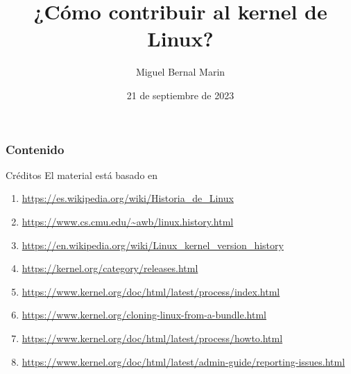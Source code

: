 \documentclass[aspectratio=169]{beamer}
\title{¿Cómo contribuir al kernel de Linux?}
\author[\textcircled{cc} BY-SA]{Miguel Bernal Marin} %
\institute[]
{
Nombre del evento \\
}
\date{
    21 de septiembre de 2023
}
\newcommand{\nologo}{\setbeamertemplate{logo}{}} %
\begin{document}
\begin{frame}
    \titlepage
\end{frame}

{\nologo}


\begin{frame}
    \frametitle{Contenido}
    \tableofcontents
\end{frame}



\begin{frame}[c]{Créditos}
  \label{creditos}
  El material está basado en
  \begin{enumerate}
    \item
      \href{https://es.wikipedia.org/wiki/Historia_de_Linux}
      {https://es.wikipedia.org/wiki/Historia\_de\_Linux}
    \item
      \href{https://www.cs.cmu.edu/~awb/linux.history.html}
      {https://www.cs.cmu.edu/\~{}awb/linux.history.html}
    \item
      \href{https://en.wikipedia.org/wiki/Linux_kernel_version_history}
      {https://en.wikipedia.org/wiki/Linux\_kernel\_version\_history}
    \item
      \href{https://kernel.org/category/releases.html}
      {https://kernel.org/category/releases.html}
    \item
      \href{https://www.kernel.org/doc/html/latest/process/index.html}
      {https://www.kernel.org/doc/html/latest/process/index.html}
    \item
      \href{https://www.kernel.org/cloning-linux-from-a-bundle.html}
      {https://www.kernel.org/cloning-linux-from-a-bundle.html}
    \item
      \href{https://www.kernel.org/doc/html/latest/process/howto.html}
      {https://www.kernel.org/doc/html/latest/process/howto.html}
    \item
      \href{https://www.kernel.org/doc/html/latest/admin-guide/reporting-issues.html}
      {https://www.kernel.org/doc/html/latest/admin-guide/reporting-issues.html}
  \end{enumerate}
\end{frame}
\end{document}
